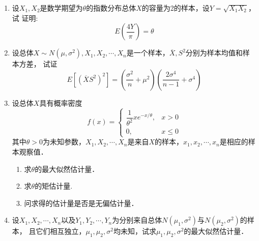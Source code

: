 \documentclass[10pt,a4paper]{article}
\begin{document}
    
\begin{enumerate}


    \item 设$X_1,X_2$是数学期望为$\theta$的指数分布总体$X$的容量为2的样本，设$Y=\sqrt{X_1X_2}$，试
    证明:
    $$E(\frac{4Y}{\pi})=\theta$$





    \item 设总体$X\sim N(\mu,\sigma^2),X_1,X_2,\cdots,X_n$是一个样本，$\overline{X},S^2$分别为样本均值和样本方差，
    试证
    $$E[(\overline{X}S^2)^2]=\left(\frac{\sigma^2}{n}+\mu^2\right)\left(\frac{2\sigma^4}{n-1}+\sigma^4\right)$$







    \item 设总体$X$具有概率密度
    $$f(x)=\left\{\begin{array}{ll}
        \dfrac{1}{\theta^2}xe^{-x/\theta}, & x>0\\
        0, & x\leq 0
    \end{array}\right.$$
    其中$\theta>0$为未知参数，$X_1,X_2,\cdots,X_n$是来自$X$的样本，$x_1,x_2,\cdots,x_n$是相应的样本观察值．
    \begin{enumerate}
        \item 求$\theta$的最大似然估计量．
        \item 求$\theta$的矩估计量.
        \item 问求得的估计量是否是无偏估计量．
    \end{enumerate}




    \item 设$X_1,X_2,\cdots,X_n$以及$Y_1,Y_2,\cdots,Y_n$为分别来自总体$N(\mu_1,\sigma^2)$与$N(\mu_2,\sigma^2)$的样本，
    且它们相互独立，$\mu_1,\mu_2,\sigma^2$均未知，试求$\mu_1,\mu_2,\sigma^2$的最大似然估计量．





\end{enumerate}
\end{document}
